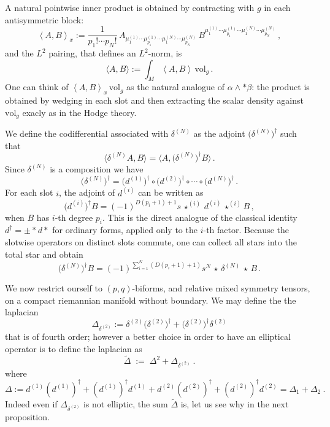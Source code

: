 \documentclass[a4paper,12pt]{article}
\newcommand{\vol}{\mathrm{vol}}
\newcommand{\inner}[2]{\left\langle #1,#2\right\rangle}
\newcommand{\Ltwo}[2]{\langle #1,#2\rangle}
\begin{document}
A natural pointwise inner product is obtained by contracting with $g$ in each antisymmetric block:
\begin{equation}
\inner{A}{B}_{x}
:=\frac{1}{p_{1}!\cdots p_{N}!}\,
A_{\mu^{(1)}_{1}\cdots\mu^{(1)}_{p_{1}}\cdots\mu^{(N)}_{1}\cdots\mu^{(N)}_{p_{N}}}\,
B^{\mu^{(1)}_{1}\cdots\mu^{(1)}_{p_{1}}\cdots\mu^{(N)}_{1}\cdots\mu^{(N)}_{p_{N}}}\, ,
\label{prod}
\end{equation}
and the $L^{2}$ pairing, that defines an $L^2$-norm, is
\begin{equation}
\Ltwo{A}{B}:=\int_{M}\inner{A}{B}\,\vol_{g}\, .
\label{prodt}
\end{equation}
One can think of $\inner{A}{B}_x\,\vol_{g}$ as the natural analogue of $\alpha\wedge *\beta$:
the product is obtained by wedging in each slot and then extracting the scalar density against $\vol_{g}$ exacly as in the Hodge theory.

We define the codifferential associated with $\delta^{(N)}$ as the adjoint $\big(\delta^{(N)}\big)^{\dagger}$ such that 
\begin{equation}
    \Ltwo{\delta^{(N)}A}{B}=\Ltwo{A}{\big(\delta^{(N)}\big)^{\dagger}B}\, .
\end{equation}
Since $\delta^{(N)}$ is a composition we have
\[
\big(\delta^{(N)}\big)^{\dagger}
=\bigl(d^{(1)}\bigr)^{\dagger}\circ\bigl(d^{(2)}\bigr)^{\dagger}\circ\cdots\circ\bigl(d^{(N)}\bigr)^{\dagger}\, .
\]
For each slot $i$, the adjoint of $d^{(i)}$ can be written as
\[
\bigl(d^{(i)}\bigr)^{\dagger}B
=
(-1)^{D(p_{i}+1)+1}s\,\star^{(i)}\, d^{(i)}\, \star^{(i)}B\, ,
\]
when $B$ has $i$-th degree $p_{i}$.
This is the direct analogue of the classical identity $d^{\dagger}=\pm *d*$ for ordinary forms,
applied only to the $i$-th factor. Because the slotwise operators on distinct slots commute, one can collect all stars into the total star and obtain
\[
\big(\delta^{(N)}\big)^{\dagger}B
=
(-1)^{\sum_{i=1}^{N}\left(D(p_{i}+1)+1\right)}s^N\,
\star\,\delta^{(N)}\,\star\,B\, .
\]

We now restrict ourself to $(p,q)$-biforms, and relative mixed symmetry tensors, on a compact riemannian manifold without boundary. We may define the the laplacian 
\begin{equation}
\Delta_{\delta^{(2)}}:=\delta^{(2)}\big(\delta^{(2)}\big)^{\dagger}+\big(\delta^{(2)}\big)^{\dagger}\delta^{(2)}
\label{lap+}
\end{equation}
that is of fourth order; however a better choice in order to have an elliptical operator is to define the laplacian as 
\begin{equation}
\widetilde{\Delta} \;:=\; \Delta^{2}+\Delta_{\delta^{(2)}}\ .
\end{equation}
where 
\begin{equation}
\Delta:= d^{(1)}(d^{(1)})^{\dagger}+(d^{(1)})^{\dagger}d^{(1)}+d^{(2)}(d^{(2)})^{\dagger}+(d^{(2)})^{\dagger}d^{(2)}=\Delta_1 + \Delta_2\ .
\label{lap1}
\end{equation}
Indeed even if $\Delta_{\delta^{(2)}}$ is not elliptic, the sum $\widetilde{\Delta}$ is, let us see why in the next proposition.
\end{document}
